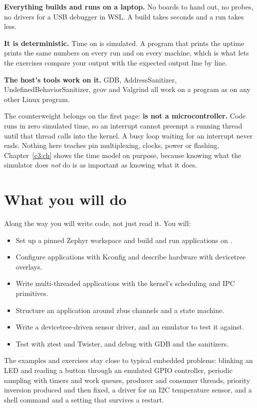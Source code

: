 \textbf{Everything builds and runs on a laptop.} No boards to hand out, no probes, no drivers for a
USB debugger in WSL. A build takes seconds and a run takes less.

\textbf{It is deterministic.} Time on  is simulated. A program that prints the
uptime prints the same numbers on every run and on every machine, which is what lets the exercises
compare your output with the expected output line by line.

\textbf{The host's tools work on it.} GDB, AddressSanitizer, UndefinedBehaviorSanitizer, gcov and
Valgrind all work on a  program as on any other Linux program.

The counterweight belongs on the first page: \textbf{ is not a microcontroller.}
Code runs in zero simulated time, so an interrupt cannot preempt a running thread until that thread
calls into the kernel. A busy loop waiting for an interrupt never ends. Nothing here teaches pin
multiplexing, clocks, power or flashing. Chapter~\ref{c3:ch} shows the time model on purpose,
because knowing what the simulator does \emph{not} do is as important as knowing what it does.

\section*{What you will do}
Along the way you will write code, not just read it. You will:
\begin{itemize}
  \item Set up a pinned Zephyr workspace and build and run applications on .
  \item Configure applications with Kconfig and describe hardware with devicetree overlays.
  \item Write multi-threaded applications with the kernel's scheduling and IPC primitives.
  \item Structure an application around zbus channels and a state machine.
  \item Write a devicetree-driven sensor driver, and an emulator to test it against.
  \item Test with ztest and Twister, and debug with GDB and the sanitizers.
\end{itemize}

The examples and exercises stay close to typical embedded problems: blinking an LED and reading a
button through an emulated GPIO controller, periodic sampling with timers and work queues, producer
and consumer threads, priority inversion produced and then fixed, a driver for an I2C temperature
sensor, and a shell command and a setting that survives a restart.

